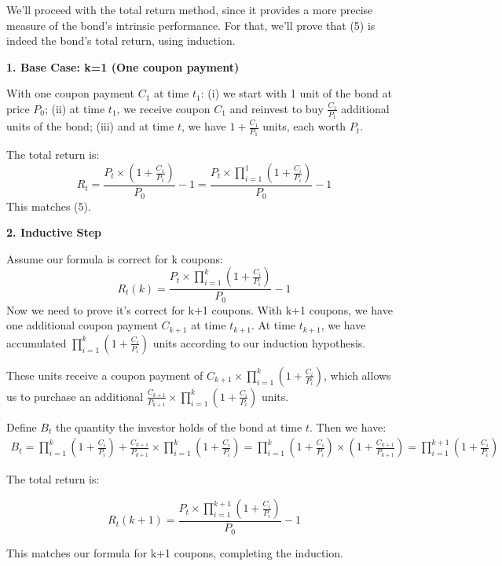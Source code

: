\documentclass[10pt]{report}
\begin{document}
We'll proceed with the total return method, since it provides a more precise measure of the bond's intrinsic performance. For that, we'll prove that (5) is indeed the bond's total return, using induction.

\textbf{1. Base Case: k=1 (One coupon payment)}

With one coupon payment $C_1$ at time $t_1$: (i) we start with 1 unit of the bond at price $P_0$; (ii) at time $t_1$, we receive coupon $C_1$ and reinvest to buy $\frac{C_1}{P_1}$ additional units of the bond; (iii) and at time $t$, we have $1 + \frac{C_1}{P_1}$ units, each worth $P_t$.

The total return is:
$$R_t = \frac{P_t \times \left(1 + \frac{C_1}{P_1}\right)}{P_0} - 1 = \frac{P_t \times \prod_{i=1}^{1} \left(1 + \frac{C_i}{P_i}\right)}{P_0} - 1$$
This matches (5).

\textbf{2. Inductive Step}

Assume our formula is correct for k coupons:
$$R_t(k) = \frac{P_{t} \times \prod_{i=1}^{k} \left(1 + \frac{C_i}{P_i}\right)}{P_0} - 1$$
Now we need to prove it's correct for k+1 coupons. With k+1 coupons, we have one additional coupon payment $C_{k+1}$ at time $t_{k+1}$. At time $t_{k+1}$, we have accumulated $\prod_{i=1}^{k} \left(1 + \frac{C_i}{P_i}\right)$ units according to our induction hypothesis.

These units receive a coupon payment of $C_{k+1} \times \prod_{i=1}^{k} \left(1 + \frac{C_i}{P_i}\right)$, which allows us to purchase an additional $\frac{C_{k+1}}{P_{k+1}} \times \prod_{i=1}^{k} \left(1 + \frac{C_i}{P_i}\right)$ units.

Define $B_{t}$ the quantity the investor holds of the bond at time $t$. Then we have:
\begin{align*}
	B_{t} = \prod_{i=1}^{k} \left(1 + \frac{C_i}{P_i}\right) + \frac{C_{k+1}}{P_{k+1}} \times \prod_{i=1}^{k} \left(1 + \frac{C_i}{P_i}\right) = \prod_{i=1}^{k} \left(1 + \frac{C_i}{P_i}\right) \times \left(1 + \frac{C_{k+1}}{P_{k+1}}\right) = \prod_{i=1}^{k+1} \left(1 + \frac{C_i}{P_i}\right)
\end{align*}

The total return is:

$$R_t(k+1) = \frac{P_{t} \times \prod_{i=1}^{k+1} \left(1 + \frac{C_i}{P_i}\right)}{P_0} - 1$$

This matches our formula for k+1 coupons, completing the induction.
\end{document}
